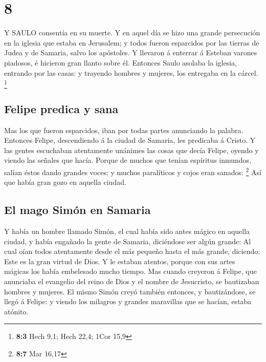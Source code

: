 \hypertarget{section-7}{%
\section{8}\label{section-7}}

 Y SAULO consentía en su muerte. Y en aquel día se hizo una
grande persecución en la iglesia que estaba en Jerusalem; y todos fueron
esparcidos por las tierras de Judea y de Samaria, salvo los apóstoles.
 Y llevaron á enterrar á Esteban varones piadosos, é
hicieron gran llanto sobre él.  Entonces Saulo asolaba la
iglesia, entrando por las casas: y trayendo hombres y mujeres, los
entregaba en la cárcel. \footnote{\textbf{8:3} Hech 9,1; Hech 22,4; 1Cor
  15,9}

\hypertarget{felipe-predica-y-sana}{%
\subsection{Felipe predica y sana}\label{felipe-predica-y-sana}}

 Mas los que fueron esparcidos, iban por todas partes
anunciando la palabra.  Entonces Felipe, descendiendo á la
ciudad de Samaria, les predicaba á Cristo.  Y las gentes
escuchaban atentamente unánimes las cosas que decía Felipe, oyendo y
viendo las señales que hacía.  Porque de muchos que tenían
espíritus inmundos, salían éstos dando grandes voces; y muchos
paralíticos y cojos eran sanados: \footnote{\textbf{8:7} Mar 16,17}
 Así que había gran gozo en aquella ciudad.

\hypertarget{el-mago-simuxf3n-en-samaria}{%
\subsection{El mago Simón en
Samaria}\label{el-mago-simuxf3n-en-samaria}}

 Y había un hombre llamado Simón, el cual había sido antes
mágico en aquella ciudad, y había engañado la gente de Samaria,
diciéndose ser algún grande:  Al cual oían todos
atentamente desde el más pequeño hasta el más grande, diciendo: Este es
la gran virtud de Dios.  Y le estaban atentos, porque con
sus artes mágicas los había embelesado mucho tiempo.  Mas
cuando creyeron á Felipe, que anunciaba el evangelio del reino de Dios y
el nombre de Jesucristo, se bautizaban hombres y mujeres. 
El mismo Simón creyó también entonces, y bautizándose, se llegó á
Felipe: y viendo los milagros y grandes maravillas que se hacían, estaba
atónito.

